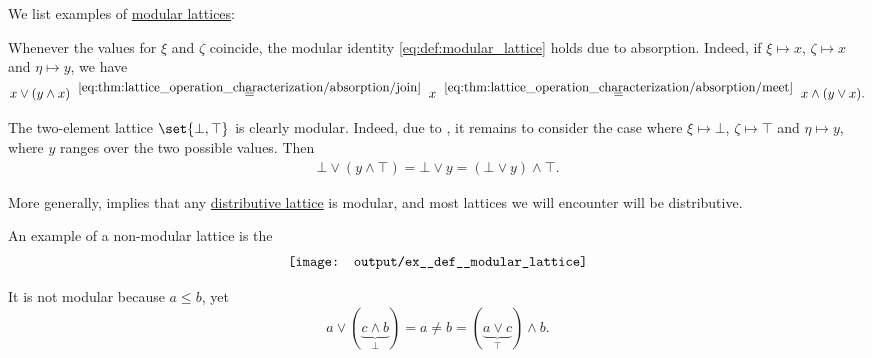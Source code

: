 \begin{example}\label{ex:def:modular_lattice}
  We list examples of \hyperref[def:modular_lattice]{modular lattices}:
  \begin{thmenum}
     Whenever the values for \( \xi \) and \( \zeta \) coincide, the modular identity \eqref{eq:def:modular_lattice} holds due to absorption. Indeed, if \( \xi \mapsto x \), \( \zeta \mapsto x \) and \( \eta \mapsto y \), we have
    \begin{equation*}
      x \vee (y \wedge x)
      \reloset {\eqref{eq:thm:lattice_operation_characterization/absorption/join}} =
      x
      \reloset {\eqref{eq:thm:lattice_operation_characterization/absorption/meet}} =
      x \wedge (y \vee x).
    \end{equation*}

     The two-element lattice \( \set{ \bot, \top } \) is clearly modular. Indeed, due to , it remains to consider the case where \( \xi \mapsto \bot \), \( \zeta \mapsto \top \) and \( \eta \mapsto y \), where \( y \) ranges over the two possible values. Then
    \begin{align*}
      \bot \vee (y \wedge \top)
      =
      \bot \vee y
      =
      (\bot \vee y) \wedge \top.
    \end{align*}

    More generally,  implies that any \hyperref[def:distributive_lattice]{distributive lattice} is modular, and most lattices we will encounter will be distributive.

     An example of a non-modular lattice is the 
    \begin{equation*}\taglabel[\logic{\( N_5 \)}]{eq:ex:def:modular_lattice/pentagon}
      \begin{aligned}
        \texttt{[image: output/ex\_\_def\_\_modular\_lattice]}
      \end{aligned}
    \end{equation*}

    It is not modular because \( a \leq b \), yet
    \begin{equation*}
      a \vee (\underbrace{c \wedge b}_{\bot})
      =
      a
      \neq
      b
      =
      (\underbrace{a \vee c}_{\top}) \wedge b.
    \end{equation*}
  \end{thmenum}
\end{example}

